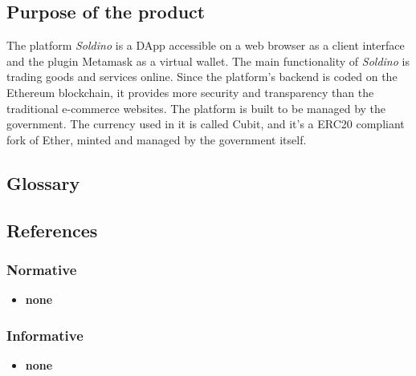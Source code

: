 \subsection{Purpose of the product}
The platform \textit{Soldino} is a DApp accessible on a web browser as a client interface and the plugin Metamask as a virtual wallet.\newline
The main functionality of \textit{Soldino} is trading goods and services online. Since the platform's backend is coded on the Ethereum blockchain, it provides more security and transparency than the traditional e-commerce websites.\newline
The platform is built to be managed by the government. The currency used in it is called Cubit, and it's a ERC20 compliant fork of Ether, minted and managed by the government itself.


\subsection{Glossary}

\subsection{References}

\subsubsection{Normative}
\begin{itemize}
	\item \textbf{none}
\end{itemize}

\subsubsection{Informative}
\begin{itemize}
	\item \textbf{none}
\end{itemize}